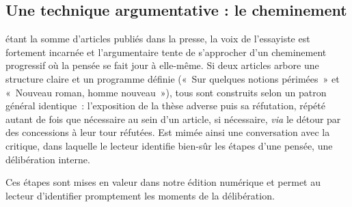 \documentclass[12pt, a4paper]{article}
\begin{document}
\subsection{Une technique argumentative : le cheminement}
\label{rhétoChemin}

\punr{} étant la somme d'articles publiés dans la presse, la voix de l'essayiste est fortement incarnée et l'argumentaire tente de s'approcher d'un cheminement progressif où la pensée se fait jour à elle-même. Si deux articles arbore une structure claire et un programme définie («~Sur quelques notions périmées~» et «~Nouveau roman, homme nouveau~»), tous sont construits selon un patron général identique~: l'exposition de la thèse adverse puis sa réfutation, répété autant de fois que nécessaire au sein d'un article, si nécessaire, \textit{via} le détour par des concessions à leur tour réfutées. Est mimée ainsi une conversation avec la critique, dans laquelle le lecteur identifie bien-sûr les étapes d'une pensée, une délibération interne.

Ces étapes sont mises en valeur dans notre édition numérique et permet au lecteur d'identifier promptement les moments de la délibération.

\end{document}
